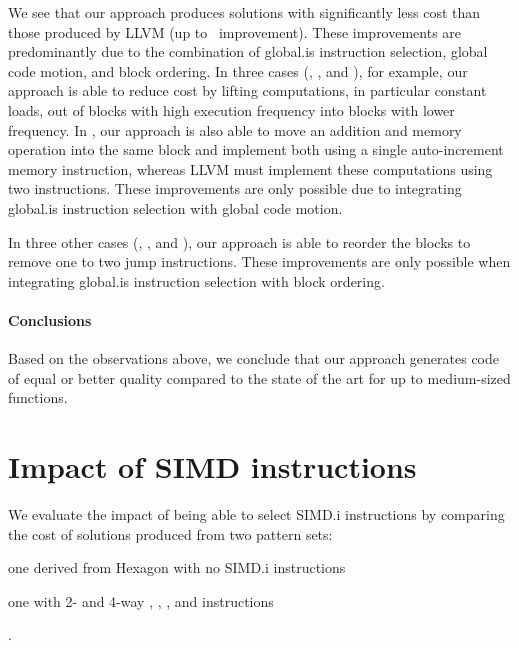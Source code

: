 We see that our approach produces \glspl{solution} with significantly less
cost than those produced by \gls{LLVM} (up to~\printZCNorm{%
  \UnisonVsLlvmHexagonFiveCyclesSpeedupCyclesZeroCenteredSpeedupMax%
} improvement).
%
These improvements are predominantly due to the combination of \gls{global.is}
\gls{instruction selection}, \gls{global code motion}, and \gls{block ordering}.
%
In three cases (, , and
), for example, our approach is able to reduce cost by lifting
computations, in particular constant loads, out of \glspl{block} with high
execution frequency into \glspl{block} with lower frequency.
%
In , our approach is also able to move an addition and
memory \gls{operation} into the same \gls{block} and implement both using a
single auto-increment memory \gls{instruction}, whereas \gls{LLVM} must
implement these computations using two \glspl{instruction}.
%
These improvements are only possible due to integrating \gls{global.is}
\gls{instruction selection} with \gls{global code motion}.

In three other cases (, ,
and ), our approach is able to reorder the
\glspl{block} to remove one to two jump \glspl{instruction}.
%
These improvements are only possible when integrating \gls{global.is}
\gls{instruction selection} with \gls{block ordering}.


\paragraph{Conclusions}

Based on the observations above, we conclude that our approach generates code of
equal or better quality compared to the state of the art for up to medium-sized
\glspl{function}.


\section{Impact of SIMD instructions}

We evaluate the impact of being able to select \gls{SIMD.i} \glspl{instruction}
by comparing the cost of \glspl{solution} produced from two \glspl{pattern set}:
%
\begin{patternList}
  \item {}
    one derived from \gls{Hexagon} with no \gls{SIMD.i} \glspl{instruction}
  \item {}
    one with \num{2}- and \num{4}-way , , ,
    and  \glspl{instruction}
\end{patternList}.


